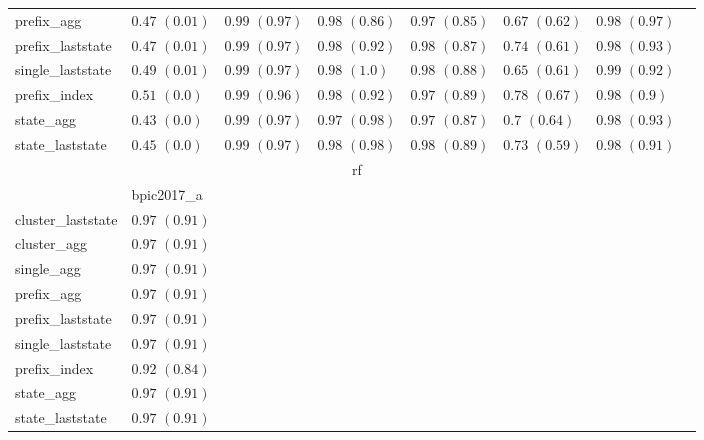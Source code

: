 \documentclass[twoside,11pt]{Latex/Classes/PhDthesisPSnPDF}
\begin{document}
\begin{table}[h]
{\begin{tabular}{llllllll}
			prefix\_agg & $0.47$ ${(0.01)}$ & $\mathbf{0.99}$ $\mathbf{(0.97)}$  & $\mathbf{0.98}$ $\mathbf{(0.86)}$  & $0.97$ ${(0.85)}$ & $0.67$ ${(0.62)}$ & $\mathbf{0.98}$ $\mathbf{(0.97)}$  \\
			prefix\_laststate & $0.47$ ${(0.01)}$ & $\mathbf{0.99}$ $\mathbf{(0.97)}$  & $\mathbf{0.98}$ $\mathbf{(0.92)}$  & $\mathbf{0.98}$ $\mathbf{(0.87)}$  & $0.74$ ${(0.61)}$ & $\mathbf{0.98}$ $\mathbf{(0.93)}$  \\
			single\_laststate & $0.49$ ${(0.01)}$ & $\mathbf{0.99}$ $\mathbf{(0.97)}$  & $\mathbf{0.98}$ $\mathbf{(1.0)}$  & $\mathbf{0.98}$ $\mathbf{(0.88)}$  & $0.65$ ${(0.61)}$ & $0.99$ ${(0.92)}$ \\
			prefix\_index & $0.51$ ${(0.0)}$ & $\mathbf{0.99}$ $\mathbf{(0.96)}$  & $\mathbf{0.98}$ $\mathbf{(0.92)}$  & $0.97$ ${(0.89)}$ & $\mathbf{0.78}$ $\mathbf{(0.67)}$  & $\mathbf{0.98}$ $\mathbf{(0.9)}$  \\
			state\_agg & $0.43$ ${(0.0)}$ & $\mathbf{0.99}$ $\mathbf{(0.97)}$  & $0.97$ ${(0.98)}$ & $0.97$ ${(0.87)}$ & $0.7$ ${(0.64)}$ & $0.98$ ${(0.93)}$ \\
			state\_laststate & $0.45$ ${(0.0)}$ & $\mathbf{0.99}$ $\mathbf{(0.97)}$  & $0.98$ ${(0.98)}$ & $\mathbf{0.98}$ $\mathbf{(0.89)}$  & $0.73$ ${(0.59)}$ & $0.98$ ${(0.91)}$ \\
			\bottomrule
			\toprule
			& \multicolumn{5}{c}{rf}
			\\
			& bpic2017\_a
			\\ \midrule
			cluster\_laststate & $\mathbf{0.97}$ $\mathbf{(0.91)}$  \\
			cluster\_agg & $\mathbf{0.97}$ $\mathbf{(0.91)}$  \\
			single\_agg & $\mathbf{0.97}$ $\mathbf{(0.91)}$  \\
			prefix\_agg & $\mathbf{0.97}$ $\mathbf{(0.91)}$  \\
			prefix\_laststate & $\mathbf{0.97}$ $\mathbf{(0.91)}$  \\
			single\_laststate & $\mathbf{0.97}$ $\mathbf{(0.91)}$  \\
			prefix\_index & $0.92$ ${(0.84)}$ \\
			state\_agg & $\mathbf{0.97}$ $\mathbf{(0.91)}$  \\
			state\_laststate & $\mathbf{0.97}$ $\mathbf{(0.91)}$  \\
			\bottomrule
			
			
		\end{tabular}%
	}
\end{table}
\end{document}
